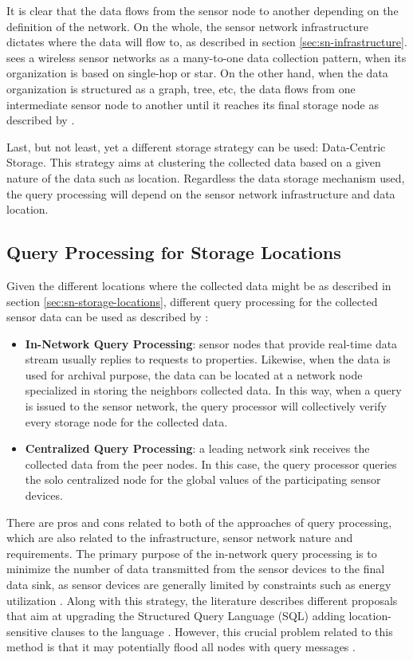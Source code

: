 It is clear that the data flows from the sensor node to another depending on
the definition of the network. On the whole, the sensor network infrastructure
dictates where the data will flow to, as described in section
\ref{sec:sn-infrastructure}. \cite{sn-storage02} sees a wireless sensor
networks as a many-to-one data collection pattern, when its organization is
based on single-hop or star. On the other hand, when the data organization is
structured as a graph, tree, etc, the data flows from one intermediate sensor
node to another until it reaches its final storage node as described by
\cite{sn-storage01}\cite{sn-storage03}.

Last, but not least, yet a different storage strategy can be used: Data-Centric
Storage. This strategy aims at clustering the collected data based on a given
nature of the data such as location. Regardless the data storage mechanism
used, the query processing will depend on the sensor network infrastructure and
data location.

\subsection{Query Processing for Storage Locations}
\label{sec:query-process}

Given the different locations where the collected data might be as described in
section \ref{sec:sn-storage-locations}, different query processing for the
collected sensor data can be used as described by \cite{sn-storage03}:

\begin{itemize}
  \item \textbf{In-Network Query Processing}: sensor nodes that provide
  real-time data stream usually replies to requests to properties.
  Likewise, when the data is used for archival purpose, the data can be
  located at a network node specialized in storing the neighbors
  collected data. In this way, when a query is issued to the sensor
  network, the query processor will collectively verify every storage
  node for the collected data.
  \item \textbf{Centralized Query Processing}: a leading network sink receives
  the collected data from the peer nodes. In this case, the query processor
  queries the solo centralized node for the global values of the
  participating sensor devices.
\end{itemize}

There are pros and cons related to both of the approaches of query processing,
which are also related to the infrastructure, sensor network nature and
requirements. The primary purpose of the in-network query processing is to
minimize the number of data transmitted from the sensor devices to the final
data sink, as sensor devices are generally limited by constraints such as
energy utilization \cite{sn-storage03}. Along with this strategy, the literature
describes different proposals that aim at upgrading the Structured Query
Language (SQL) adding location-sensitive clauses to the language \cite{sn-db-newop}.
However, this crucial problem related to this method is that it may potentially
flood all nodes with query messages \cite{sn-storage04}.

